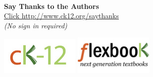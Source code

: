 \begin{titlepage}



 
\end{titlepage}


\vspace{3in}
\begin{center}


  \vspace{32pt}
  { \fontsize{40}{48}\color{black}\selectfont 
  }

  \vspace{6pt}
  \hrulefill

  \vspace{72pt}


  ~ \vfill


  \vspace{48pt}

  {\large
  \textbf{ Say Thanks to the Authors} \\
  \href{http://www.ck12.org/saythanks}{Click http://www.ck12.org/saythanks} \\
  \emph{(No sign in required)}
  }

  \includegraphics[width=1.5in]{Ck12_logo_300dpi.png}
  \includegraphics[width=1.5in]{flexbooks.jpg}
  
\end{center}


